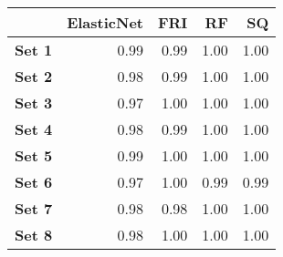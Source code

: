 \begin{tabular}{lrrrr}
\toprule
{} &  ElasticNet &   FRI &    RF &    SQ \\
\midrule
\textbf{Set 1} &        0.99 &  0.99 &  1.00 &  1.00 \\
\textbf{Set 2} &        0.98 &  0.99 &  1.00 &  1.00 \\
\textbf{Set 3} &        0.97 &  1.00 &  1.00 &  1.00 \\
\textbf{Set 4} &        0.98 &  0.99 &  1.00 &  1.00 \\
\textbf{Set 5} &        0.99 &  1.00 &  1.00 &  1.00 \\
\textbf{Set 6} &        0.97 &  1.00 &  0.99 &  0.99 \\
\textbf{Set 7} &        0.98 &  0.98 &  1.00 &  1.00 \\
\textbf{Set 8} &        0.98 &  1.00 &  1.00 &  1.00 \\
\bottomrule
\end{tabular}
